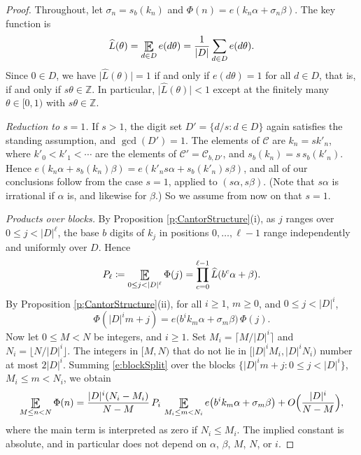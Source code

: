 \begin{proof} 
Throughout, let $\sigma_n=s_b(k_n)$ and $\Phi(n)=e(k_n\alpha+\sigma_n\beta)$. 
The key function is 
\begin{align} \label{e;widehatL}
\widehat L(\theta ) =  \Expectation _{d\in D} e(d\theta ) = \frac{1}{\lvert D\rvert} \sum_{d \in D} e(d \theta).
\end{align}
Since $0\in D$, we have $\lvert \widehat L(\theta)\rvert=1$ if and only if $e(d\theta)=1$ for all $d\in D$, that is, if and only if $s\theta\in\mathbb{Z}$. 
In particular, $\lvert\widehat L(\theta)\rvert<1$ except at the finitely many $\theta\in[0,1)$ with $s\theta\in\mathbb{Z}$. 

\smallskip 
\noindent\emph{Reduction to $s=1$.} 
If $s>1$, the digit set $D'= \{d/s \colon d\in D\}$ again satisfies the standing assumption, and $\gcd(D')=1$. 
The elements of $\mathcal C$ are $k_n=sk'_n$, where $k'_0<k'_1<\cdots$ are the elements of $\mathcal C'=\mathcal C_{b,D'}$, and $s_b(k_n)=s\,s_b(k'_n)$. 
Hence $e(k_n\alpha+s_b(k_n)\beta)=e(k'_n s\alpha+s_b(k'_n)s\beta)$, and all of our conclusions follow from the case $s=1$, applied to $(s\alpha,s\beta)$. 
(Note that $s\alpha$ is irrational if $\alpha$ is, and likewise for $\beta$.) 
So we assume from now on that $s=1$. 

\smallskip 
\noindent\emph{Products over blocks.} 
By Proposition \ref{p;CantorStructure}(i), as $j$ ranges over $0\leq j<\lvert D\rvert^\ell$, the base $b$ digits of $k_j$ in positions $0,\ldots,\ell-1$ range independently and uniformly over $D$. 
Hence 
\begin{align}  \label{e;widehat}
P_\ell \coloneqq 
\Expectation_{0\leq j<\lvert D\rvert^\ell}\Phi(j)
= \prod _{c=0}^{\ell-1} \widehat L (b^c\alpha + \beta  )  .
\end{align}
By Proposition \ref{p;CantorStructure}(ii), for all $i\geq 1$, $m\geq 0$, and $0\leq j<\lvert D\rvert^i$, 
\begin{equation}\label{e:blockSplit}
\Phi(\lvert D\rvert^im+j)=e\bigl(b^ik_m\alpha+\sigma_m\beta\bigr)\,\Phi(j). 
\end{equation}
Now let $0\leq M<N$ be integers, and $i\geq1$. Set $M_i=\lceil M/\lvert D\rvert^i\rceil$ and $N_i=\lfloor N/\lvert D\rvert^i\rfloor$. 
The integers in $[M,N)$ that do not lie in $[\lvert D\rvert^iM_i,\lvert D\rvert^iN_i)$ number at most $2\lvert D\rvert^i$. 
Summing \eqref{e:blockSplit} over the blocks $\{\lvert D\rvert^im+j\colon 0\leq j<\lvert D\rvert^i\}$, $M_i\leq m<N_i$, we obtain 
\begin{equation}\label{e:windowSplit}
\Expectation_{M\leq n<N}\Phi(n)
=\frac{\lvert D\rvert^i(N_i-M_i)}{N-M}\, P_i\, \Expectation_{M_i\leq m<N_i}e\bigl(b^ik_m\alpha+\sigma_m\beta\bigr) 
+O\Bigl(\frac{\lvert D\rvert^i}{N-M}\Bigr), 
\end{equation}
where the main term is interpreted as zero if $N_i\leq M_i$. 
The implied constant is absolute, and in particular does not depend on $\alpha$, $\beta$, $M$, $N$, or $i$. 


\end{proof}
